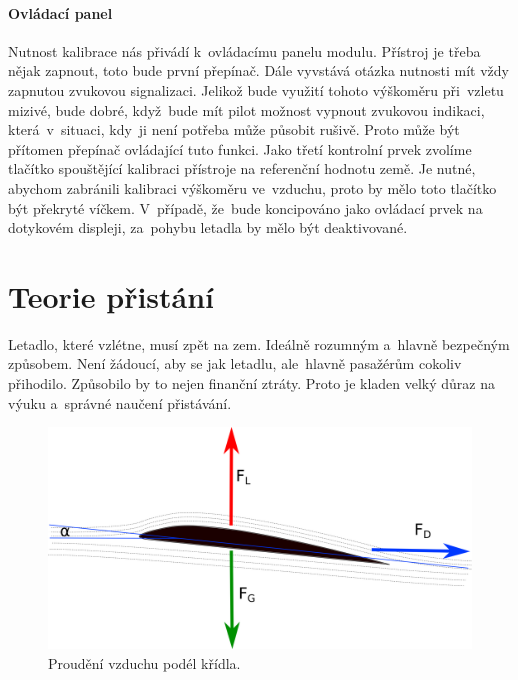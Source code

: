 			\paragraph{Ovládací panel}
				Nutnost kalibrace nás přivádí k~ovládacímu panelu modulu. Přístroj je třeba nějak zapnout, toto bude první přepínač. Dále vyvstává otázka nutnosti mít vždy zapnutou zvukovou signalizaci. Jelikož bude využití tohoto výškoměru při~vzletu mizivé, bude dobré, když~bude mít pilot možnost vypnout zvukovou indikaci, která~v~situaci, kdy~ji není potřeba může působit rušivě. Proto může být přítomen přepínač ovládající tuto funkci. Jako třetí kontrolní prvek zvolíme tlačítko spouštějící kalibraci přístroje na referenční hodnotu země. Je nutné, abychom zabránili kalibraci výškoměru ve~vzduchu, proto by mělo toto tlačítko být překryté víčkem. V~případě, že~bude koncipováno jako ovládací prvek na dotykovém displeji, za~pohybu letadla by mělo být deaktivované.
				
	\section{Teorie přistání}
		Letadlo, které vzlétne, musí zpět na zem. Ideálně rozumným a~hlavně bezpečným způsobem. Není žádoucí, aby se jak letadlu, ale~hlavně pasažérům cokoliv přihodilo. Způsobilo by to nejen finanční ztráty. Proto je kladen velký důraz na výuku a~správné naučení přistávání.  

		\begin{figure}[H]
			\begin{center}
				\includegraphics[scale=0.7]{obrazky-figures/angle_of_attack.png}
				\caption{Proudění vzduchu podél křídla.}
				\label{teorie::pristani::angle_of_attack}
			\end{center}
		\end{figure}
		
